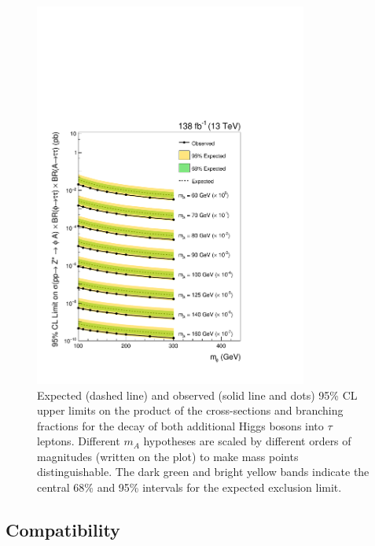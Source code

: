\begin{figure}[!hbtp]
\centering
    \includegraphics[width=0.8\textwidth]{Figures/model_independent_limit_all.pdf}
\caption[Plot of the model-independent limits on cross-section of the production from an off-shell Z boson multiplied by the branching fractions of $\phi$ and A to $\tau$ pairs.]{Expected (dashed line) and observed (solid line and dots) 95\% CL upper limits on the product of the cross-sections and branching fractions for the decay of both additional Higgs bosons into $\tau$ leptons. Different $m_{A}$ hypotheses are scaled by different orders of magnitudes (written on the plot) to make mass points distinguishable. The dark green and bright yellow bands indicate the central 68\% and 95\% intervals for the expected exclusion limit.}
\label{fig:4tau_mi}
\end{figure}

\subsection{Compatibility}

